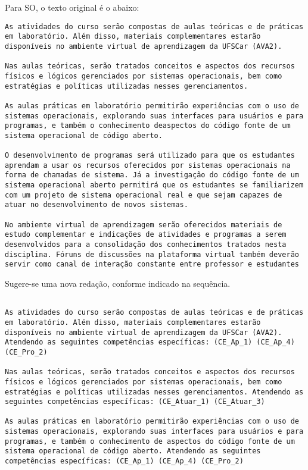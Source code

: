 \documentclass[12pt, oneside]{book}
\begin{document}
Para SO, o texto original é o abaixo:

\begin{lstlisting}
As atividades do curso serão compostas de aulas teóricas e de práticas em laboratório. Além disso, materiais complementares estarão disponíveis no ambiente virtual de aprendizagem da UFSCar (AVA2).

Nas aulas teóricas, serão tratados conceitos e aspectos dos recursos físicos e lógicos gerenciados por sistemas operacionais, bem como estratégias e políticas utilizadas nesses gerenciamentos.

As aulas práticas em laboratório permitirão experiências com o uso de sistemas operacionais, explorando suas interfaces para usuários e para programas, e também o conhecimento deaspectos do código fonte de um sistema operacional de código aberto.

O desenvolvimento de programas será utilizado para que os estudantes aprendam a usar os recursos oferecidos por sistemas operacionais na forma de chamadas de sistema. Já a investigação do código fonte de um sistema operacional aberto permitirá que os estudantes se familiarizem com um projeto de sistema operacional real e que sejam capazes de atuar no desenvolvimento de novos sistemas.

No ambiente virtual de aprendizagem serão oferecidos materiais de estudo complementar e indicações de atividades e programas a serem desenvolvidos para a consolidação dos conhecimentos tratados nesta disciplina. Fóruns de discussões na plataforma virtual também deverão servir como canal de interação constante entre professor e estudantes
\end{lstlisting}

Sugere-se uma nova redação, conforme indicado na sequência.

\begin{lstlisting}

As atividades do curso serão compostas de aulas teóricas e de práticas em laboratório. Além disso, materiais complementares estarão disponíveis no ambiente virtual de aprendizagem da UFSCar (AVA2). Atendendo as seguintes competências específicas: (CE_Ap_1) (CE_Ap_4) (CE_Pro_2)

Nas aulas teóricas, serão tratados conceitos e aspectos dos recursos físicos e lógicos gerenciados por sistemas operacionais, bem como estratégias e políticas utilizadas nesses gerenciamentos. Atendendo as seguintes competências específicas: (CE_Atuar_1) (CE_Atuar_3)

As aulas práticas em laboratório permitirão experiências com o uso de sistemas operacionais, explorando suas interfaces para usuários e para programas, e também o conhecimento de aspectos do código fonte de um sistema operacional de código aberto. Atendendo as seguintes competências específicas: (CE_Ap_1) (CE_Ap_4) (CE_Pro_2)
\end{lstlisting}
\end{document}
